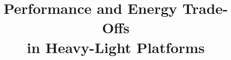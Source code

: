 \documentclass{sig-alternate-05-2015}
\begin{document}






%

\title{Performance and Energy Trade-Offs \\ in Heavy-Light Platforms}



%
%
%
%
%

\end{document}

